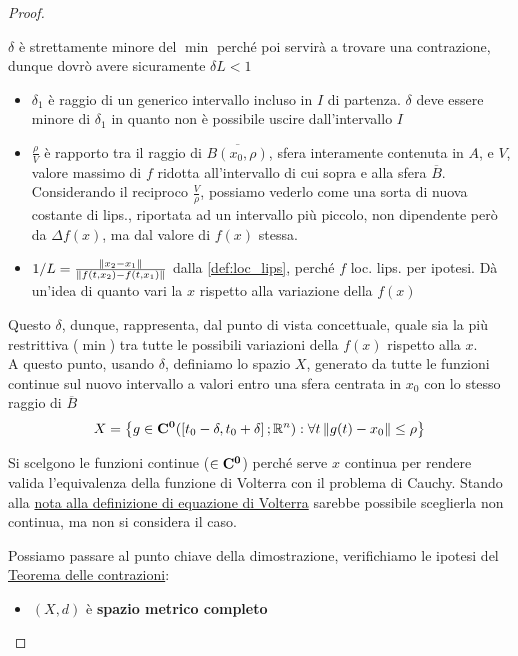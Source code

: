 \begin{proof}
\begin{equation}
	\end{equation}
	\begin{note}
		$\delta$ è strettamente minore del $\min$ perché poi servirà a trovare una contrazione, dunque dovrò avere sicuramente $\delta L < 1$
	\end{note}
	\begin{itemize}
		\item $\delta_1$ è raggio di un generico intervallo incluso in $I$ di partenza. $\delta$ deve essere minore di $\delta_1$ in quanto non è possibile uscire dall'intervallo $I$
		\item $\frac{\rho}{V}$ è rapporto tra il raggio di $\overline{B(x_0,\rho)}$, sfera interamente contenuta in $A$, e $V$, valore massimo di $f$ ridotta all'intervallo di cui sopra e alla sfera $\overline{B}$.\\
		Considerando il reciproco $\frac{V}{\rho}$, possiamo vederlo come una sorta di nuova costante di lips., riportata ad un intervallo più piccolo, non dipendente però da $\Delta f(x)$, ma dal valore di $f(x)$ stessa.
		\item $1/L = \frac{\left\|x_2-x_1\right\|}{\left\|f(t,x_2)-f(t,x_1)\right\|}$ dalla \ref{def:loc_lips}, perché $f$ loc. lips. per ipotesi. Dà un'idea di quanto vari la $x$ rispetto alla variazione della $f(x)$
	\end{itemize}
	Questo $\delta$, dunque, rappresenta, dal punto di vista concettuale, quale sia la più restrittiva ($\min$) tra tutte le possibili variazioni della $f(x)$ rispetto alla $x$.\\
	A questo punto, usando $\delta$, definiamo lo spazio $X$, generato da tutte le funzioni continue sul nuovo intervallo a valori entro una sfera centrata in $x_0$ con lo stesso raggio di $\overline{B}$
	$$X = \left\{g\in \mathbf{C^{0}}(\left[t_0-\delta,t_0+\delta\right];\mathbb{R}^n):\forall t\left\|g(t)-x_0\right\|\leq \rho\right\}$$
	\begin{note}
		Si scelgono le funzioni continue ($\in \mathbf{C^{0}}$) perché serve $x$ continua per rendere valida l'equivalenza della funzione di Volterra con il problema di Cauchy. Stando alla \hyperlink{note:volterra_non_cont}{nota alla definizione di equazione di Volterra} sarebbe possibile sceglierla non continua, ma non si considera il caso.
	\end{note}
	Possiamo passare al punto chiave della dimostrazione, verifichiamo le ipotesi del \hyperref[teo:contrazioni]{Teorema delle contrazioni}:
	\begin{itemize}
		\item $(X,d)$ è \textbf{spazio metrico completo}\\

\end{itemize}
\end{proof}
